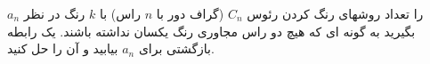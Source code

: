 \exercise
$a_n$
را تعداد روشهای رنگ کردن رئوس
$C_n$
(گراف دور با
$n$
راس) با
$k$
رنگ در نظر بگیرید به گونه ای که هیچ دو راس مجاوری رنگ یکسان نداشته باشند. یک رابطه بازگشتی برای
$a_n$
بیابید و آن را حل کنید.